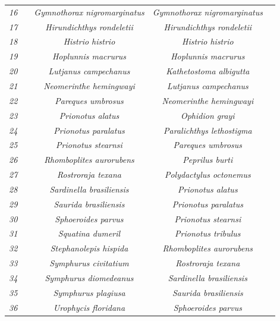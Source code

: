\documentclass[
  letterpaper,
  DIV=11,
  numbers=noendperiod]{scrartcl}
\begin{document}
\begin{longtable*}[t]{ccccc}
\addlinespace
\em{16} & \em{} & \em{Gymnothorax nigromarginatus} & \em{Gymnothorax nigromarginatus} & \em{}\\
\em{17} & \em{} & \em{Hirundichthys rondeletii} & \em{Hirundichthys rondeletii} & \em{}\\
\em{18} & \em{} & \em{Histrio histrio} & \em{Histrio histrio} & \em{}\\
\em{19} & \em{} & \em{Hoplunnis macrurus} & \em{Hoplunnis macrurus} & \em{}\\
\em{20} & \em{} & \em{Lutjanus campechanus} & \em{Kathetostoma albigutta} & \em{}\\
\addlinespace
\em{21} & \em{} & \em{Neomerinthe hemingwayi} & \em{Lutjanus campechanus} & \em{}\\
\em{22} & \em{} & \em{Pareques umbrosus} & \em{Neomerinthe hemingwayi} & \em{}\\
\em{23} & \em{} & \em{Prionotus alatus} & \em{Ophidion grayi} & \em{}\\
\em{24} & \em{} & \em{Prionotus paralatus} & \em{Paralichthys lethostigma} & \em{}\\
\em{25} & \em{} & \em{Prionotus stearnsi} & \em{Pareques umbrosus} & \em{}\\
\addlinespace
\em{26} & \em{} & \em{Rhomboplites aurorubens} & \em{Peprilus burti} & \em{}\\
\em{27} & \em{} & \em{Rostroraja texana} & \em{Polydactylus octonemus} & \em{}\\
\em{28} & \em{} & \em{Sardinella brasiliensis} & \em{Prionotus alatus} & \em{}\\
\em{29} & \em{} & \em{Saurida brasiliensis} & \em{Prionotus paralatus} & \em{}\\
\em{30} & \em{} & \em{Sphoeroides parvus} & \em{Prionotus stearnsi} & \em{}\\
\addlinespace
\em{31} & \em{} & \em{Squatina dumeril} & \em{Prionotus tribulus} & \em{}\\
\em{32} & \em{} & \em{Stephanolepis hispida} & \em{Rhomboplites aurorubens} & \em{}\\
\em{33} & \em{} & \em{Symphurus civitatium} & \em{Rostroraja texana} & \em{}\\
\em{34} & \em{} & \em{Symphurus diomedeanus} & \em{Sardinella brasiliensis} & \em{}\\
\em{35} & \em{} & \em{Symphurus plagiusa} & \em{Saurida brasiliensis} & \em{}\\
\addlinespace
\em{36} & \em{} & \em{Urophycis floridana} & \em{Sphoeroides parvus} & \em{}\\

\end{longtable*}
\end{document}

